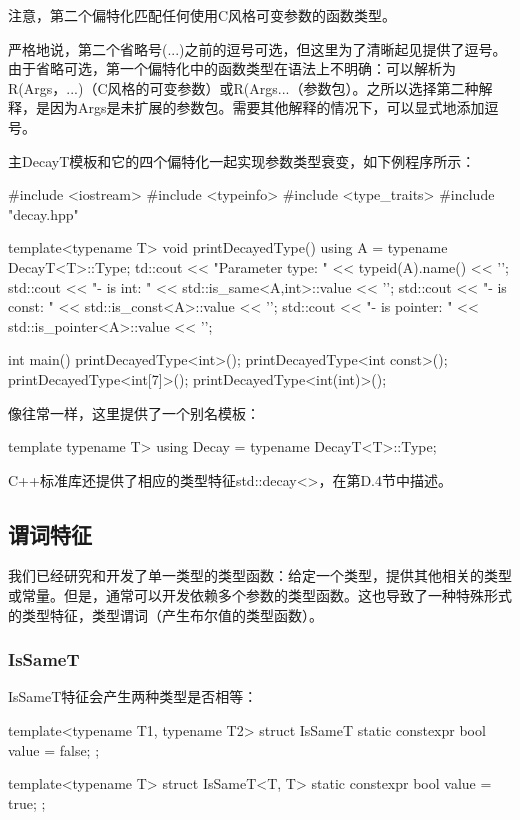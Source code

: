 注意，第二个偏特化匹配任何使用C风格可变参数的函数类型。

\begin{notice}
严格地说，第二个省略号(...)之前的逗号可选，但这里为了清晰起见提供了逗号。由于省略可选，第一个偏特化中的函数类型在语法上不明确：可以解析为R(Args，...)（C风格的可变参数）或R(Args...（参数包）。之所以选择第二种解释，是因为Args是未扩展的参数包。需要其他解释的情况下，可以显式地添加逗号。
\end{notice}

主DecayT模板和它的四个偏特化一起实现参数类型衰变，如下例程序所示：

\begin{cpp}
#include <iostream>
#include <typeinfo>
#include <type_traits>
#include "decay.hpp"

template<typename T>
void printDecayedType() {
	using A = typename DecayT<T>::Type;
	td::cout << "Parameter type: " << typeid(A).name() << '\n';
	std::cout << "- is int: " << std::is_same<A,int>::value << '\n';
	std::cout << "- is const: " << std::is_const<A>::value << '\n';
	std::cout << "- is pointer: " << std::is_pointer<A>::value << '\n';
}

int main() {
	printDecayedType<int>();
	printDecayedType<int const>();
	printDecayedType<int[7]>();
	printDecayedType<int(int)>();
}
\end{cpp}

像往常一样，这里提供了一个别名模板：

\begin{cpp}
template typename T>
using Decay = typename DecayT<T>::Type;
\end{cpp}

C++标准库还提供了相应的类型特征std::decay<>，在第D.4节中描述。

\subsection{谓词特征}

我们已经研究和开发了单一类型的类型函数：给定一个类型，提供其他相关的类型或常量。但是，通常可以开发依赖多个参数的类型函数。这也导致了一种特殊形式的类型特征，类型谓词（产生布尔值的类型函数）。

\subsubsection{IsSameT}

IsSameT特征会产生两种类型是否相等：

\begin{cpp}
template<typename T1, typename T2>
struct IsSameT {
	static constexpr bool value = false;
};

template<typename T>
struct IsSameT<T, T> {
	static constexpr bool value = true;
};
\end{cpp}

